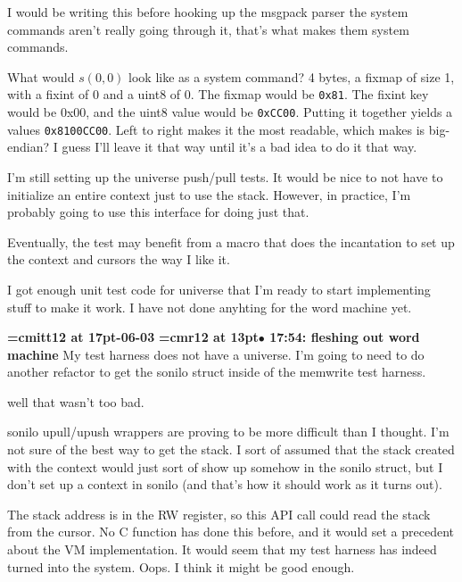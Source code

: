 I would be writing this before hooking up the msgpack parser the system commands aren't really going through it, that's what makes them system commands.
\par

What would $s(0,0)$ look like as a system command? 4 bytes, a fixmap of size 1, with a fixint of 0 and a uint8 of 0. The fixmap would be {\tt 0x81}. The fixint key would be {0x00}, and the uint8 value would be {\tt 0xCC00}. Putting it together yields a values {\tt 0x8100CC00}. Left to right makes it the most readable, which makes is big-endian? I guess I'll leave it that way until it's a bad idea to do it that way.
\par

I'm still setting up the universe push/pull tests. It would be nice to not have to initialize an entire context just to use the stack. However, in practice, I'm probably going to use this interface for doing just that.
\par

Eventually, the test may benefit from a macro that does the incantation to set up the context and cursors the way I like it.
\par

I got enough unit test code for universe that I'm ready to start implementing stuff to make it work. I have not done anyhting for the word machine yet.
\par

{\medskip\noindent\bf\font\titlefont=cmitt12 at 17pt-06-03}\medskip
{\smallskip\noindent\bf\font\titlefont=cmr12 at 13pt\titlefont $\bullet$ 17:54: fleshing out word machine}\smallskip
My test harness does not have a universe. I'm going to need to do another refactor to get the sonilo struct inside of the memwrite test harness.
\par

well that wasn't too bad.
\par

sonilo upull/upush wrappers are proving to be more difficult than I thought. I'm not sure of the best way to get the stack. I sort of assumed that the stack created with the context would just sort of show up somehow in the sonilo struct, but I don't set up a context in sonilo (and that's how it should work as it turns out).
\par

The stack address is in the RW register, so this API call could read the stack from the cursor. No C function has done this before, and it would set a precedent about the VM implementation. It would seem that my test harness has indeed turned into the system. Oops. I think it might be good enough.
\par

